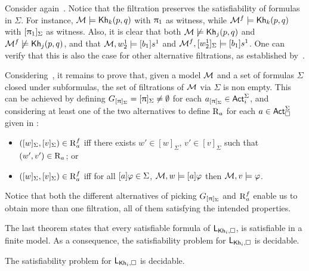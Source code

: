 \medskip 

\begin{example}\label{ex:filtration-preserves}
 Consider again~. Notice that the filtration preserves the satisfiability of formulas in $\Sigma$. For instance, $\mathcal{M}\models{\sf Kh}_k(p,q)$ with $\uppi_1$ as witness, while $\mathcal{M}^f\models{\sf Kh}_k(p,q)$ with $[\uppi_1]_\Sigma$ as witness. Also, it is clear that both $\mathcal{M}\not\models{\sf Kh}_j(p,q)$ and $\mathcal{M}^f\not\models{\sf Kh}_j(p,q)$, and that $\mathcal{M},w^1_2\models[b_1] s^1$ and $\mathcal{M}^f,[w^1_2]_\Sigma\models[b_1] s^1$. One can verify that this is also the case for other alternative filtrations, as established by~.
\end{example}

\medskip

Considering~, it remains to prove that, given a model $\mathcal{M}$ and a set of formulas $\Sigma$ closed under subformulas, the set of filtrations of $\mathcal{M}$ via $\Sigma$ is non empty.
This can be achieved by defining $G_{[\uppi]_\Sigma} = [\uppi]_\Sigma \neq \emptyset$ for each $a_{[\uppi]_\Sigma} \in {\rm \sf Act}^\Sigma_i$, and considering at least one of the two alternatives to define $\operatorname{R}_a$ for each $a \in {\rm \sf Act}^\Sigma_\square$ given in \cite{HML,mlbook}:

\begin{itemize}
\item $([w]_\Sigma,[v]_\Sigma) \in \operatorname{R}^f_a$ iff there exists $w' \in [w]_\Sigma$, $v' \in [v]_\Sigma$ such that $(w',v') \in \operatorname{R}_a$; or
\item $([w]_\Sigma,[v]_\Sigma) \in \operatorname{R}^f_a$ iff for all $[a]\varphi \in \Sigma$, $\mathcal{M},w \models [a]\varphi$ then $\mathcal{M},v \models \varphi$.
\end{itemize}

Notice that both the different alternatives of picking $G_{[\uppi]_\Sigma}$ and $\operatorname{R}^f_a$ enable us to obtain more than one filtration, all of them satisfying the intended properties.

\medskip

The last theorem states that every satisfiable formula of $\mathsf{L}_{{\sf Kh}_i,\square}$, is satisfiable in a finite model.
As a consequence, the satisfiability problem for $\mathsf{L}_{{\sf Kh}_i,\square}$ is decidable.

\medskip

\begin{corollary}\label{cor:extended-decidable}
The satisfiability problem for $\mathsf{L}_{{\sf Kh}_i,\square}$ is decidable.
\end{corollary}


